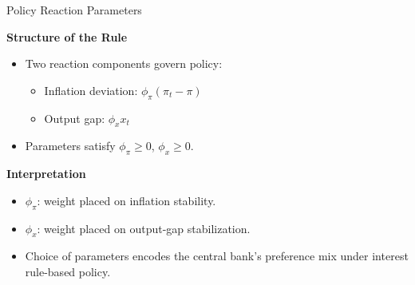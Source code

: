 \documentclass[11pt,aspectratio=169]{beamer}
\begin{document}
\begin{frame}{Policy Reaction Parameters}
\small

\textbf{Structure of the Rule}
\begin{itemize}
    \item Two reaction components govern policy:
    \begin{itemize}
        \item Inflation deviation: \(\phi_\pi(\pi_t-\pi)\)
        \item Output gap: \(\phi_x x_t\)
    \end{itemize}
    \item Parameters satisfy \(\phi_\pi \ge 0\), \(\phi_x \ge 0\).
\end{itemize}

\textbf{Interpretation}
\begin{itemize}
    \item \(\phi_\pi\): weight placed on inflation stability.
    \item \(\phi_x\): weight placed on output-gap stabilization.
    \item Choice of parameters encodes the central bank’s preference mix under interest rule-based policy.
\end{itemize}

\end{frame}
\end{document}
